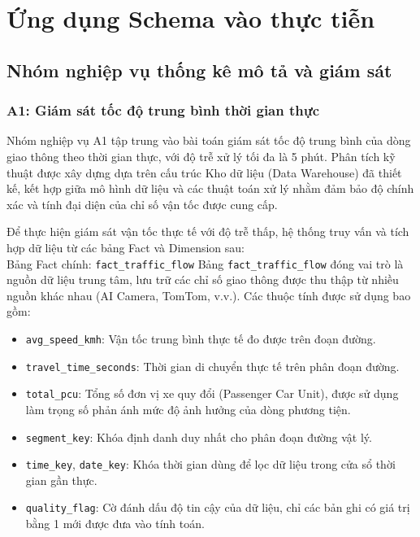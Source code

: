 \section{Ứng dụng Schema vào thực tiễn}
\subsection{Nhóm nghiệp vụ thống kê mô tả và giám sát}
\subsubsection{A1: Giám sát tốc độ trung bình thời gian thực}

Nhóm nghiệp vụ A1 tập trung vào bài toán giám sát tốc độ trung bình của dòng giao thông theo thời gian thực, với độ trễ xử lý tối đa là 5 phút. Phân tích kỹ thuật được xây dựng dựa trên cấu trúc Kho dữ liệu (Data Warehouse) đã thiết kế, kết hợp giữa mô hình dữ liệu và các thuật toán xử lý nhằm đảm bảo độ chính xác và tính đại diện của chỉ số vận tốc được cung cấp.


Để thực hiện giám sát vận tốc thực tế với độ trễ thấp, hệ thống truy vấn và tích hợp dữ liệu từ các bảng Fact và Dimension sau:\\

Bảng Fact chính: \texttt{fact\_traffic\_flow}
Bảng \texttt{fact\_traffic\_flow} đóng vai trò là nguồn dữ liệu trung tâm, lưu trữ các chỉ số giao thông được thu thập từ nhiều nguồn khác nhau (AI Camera, TomTom, v.v.). Các thuộc tính được sử dụng bao gồm:
\begin{itemize}
    \item \texttt{avg\_speed\_kmh}: Vận tốc trung bình thực tế đo được trên đoạn đường.
    \item \texttt{travel\_time\_seconds}: Thời gian di chuyển thực tế trên phân đoạn đường.
    \item \texttt{total\_pcu}: Tổng số đơn vị xe quy đổi (Passenger Car Unit), được sử dụng làm trọng số phản ánh mức độ ảnh hưởng của dòng phương tiện.
    \item \texttt{segment\_key}: Khóa định danh duy nhất cho phân đoạn đường vật lý.
    \item \texttt{time\_key}, \texttt{date\_key}: Khóa thời gian dùng để lọc dữ liệu trong cửa sổ thời gian gần thực.
    \item \texttt{quality\_flag}: Cờ đánh dấu độ tin cậy của dữ liệu, chỉ các bản ghi có giá trị bằng 1 mới được đưa vào tính toán.
\end{itemize}

